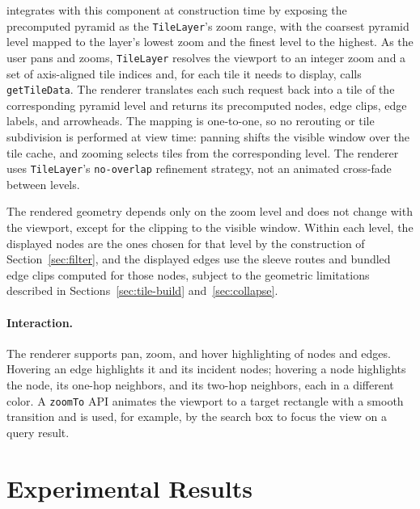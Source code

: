 \documentclass[review]{vgtc}          %
\newcommand{\msagljs}{\textsf{\libname}}
\begin{document}
\msagljs{} integrates with this component at construction time by
exposing the precomputed pyramid as the \texttt{TileLayer}'s zoom
range, with the coarsest pyramid level mapped to the layer's lowest
zoom and the finest level to the highest. As the user pans and zooms,
\texttt{TileLayer} resolves the viewport to an integer zoom and a set
of axis-aligned tile indices and, for each tile it needs to display,
calls \texttt{getTileData}. The renderer translates each such request
back into a tile of the corresponding pyramid level and returns its
precomputed nodes, edge clips, edge labels, and arrowheads. The
mapping is one-to-one, so no rerouting or tile subdivision is performed at view
time: panning shifts the visible window over the tile cache, and
zooming selects tiles from the corresponding level. The renderer uses
\texttt{TileLayer}'s \texttt{no-overlap} refinement strategy, not an
animated cross-fade between levels.

The rendered geometry depends only on the zoom level and does not
change with the viewport, except for the clipping to the visible
window. Within each level, the displayed nodes are the ones chosen
for that level by the construction of Section~\ref{sec:filter}, and
the displayed edges use the sleeve routes and bundled edge clips
computed for those nodes, subject to the geometric limitations
described in Sections~\ref{sec:tile-build} and~\ref{sec:collapse}.

\paragraph{Interaction.}
The renderer supports pan, zoom, and hover highlighting of nodes and
edges. Hovering an edge highlights it and its incident nodes; hovering
a node highlights the node, its one-hop neighbors, and its two-hop
neighbors, each in a different color. A \texttt{zoomTo} API animates
the viewport to a target rectangle with a smooth transition and is
used, for example, by the search box to focus the view on a query
result.
\section{Experimental Results}
\label{sec:experiments}
\end{document}

